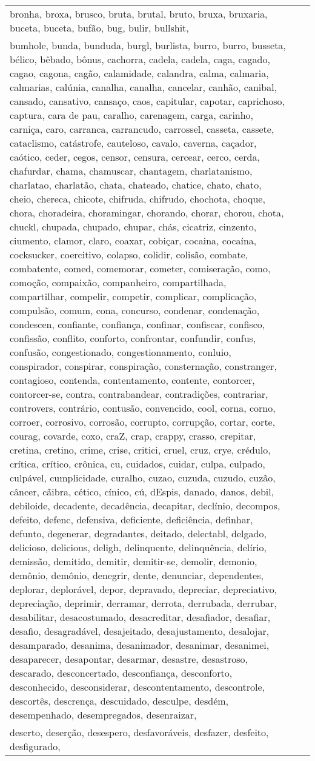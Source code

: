 \begin{longtable}{|*3{p{15cm}|}}
bronha, broxa, brusco, bruta, brutal, bruto, bruxa, bruxaria, buceta, buceta, bufão, bug, bulir, bullshit, \\ bumhole, bunda, bunduda, burgl, burlista, burro, burro, busseta, bélico, bêbado, bônus, cachorra, cadela, cadela, caga, cagado, cagao, cagona, cagão, calamidade, calandra, calma, calmaria, calmarias, calúnia, canalha, canalha, cancelar, canhão, canibal, cansado, cansativo, cansaço, caos, capitular, capotar, caprichoso, captura, cara de pau, caralho, carenagem, carga, carinho, carniça, caro, carranca, carrancudo, carrossel, casseta, cassete, cataclismo, catástrofe, cauteloso, cavalo, caverna, caçador, caótico, ceder, cegos, censor, censura, cercear, cerco, cerda, chafurdar, chama, chamuscar, chantagem, charlatanismo, charlatao, charlatão, chata, chateado, chatice, chato, chato, cheio, chereca, chicote, chifruda, chifrudo, chochota, choque, chora, choradeira, choramingar, chorando, chorar, chorou, chota, chuckl, chupada, chupado, chupar, chás, cicatriz, cinzento, ciumento, clamor, claro, coaxar, cobiçar, cocaina, cocaína, cocksucker, coercitivo, colapso, colidir, colisão, combate, combatente, comed, comemorar, cometer, comiseração, como, comoção, compaixão, companheiro, compartilhada, compartilhar, compelir, competir, complicar, complicação, compulsão, comum, cona, concurso, condenar, condenação, condescen, confiante, confiança, confinar, confiscar, confisco, confissão, conflito, conforto, confrontar, confundir, confus, confusão, congestionado, congestionamento, conluio, conspirador, conspirar, conspiração, consternação, constranger, contagioso, contenda, contentamento, contente, contorcer, contorcer-se, contra, contrabandear,  contradições, contrariar, controvers, contrário, contusão, convencido, cool, corna, corno, corroer, corrosivo, corrosão, corrupto, corrupção, cortar, corte, courag, covarde, coxo, craZ, crap, crappy, crasso, crepitar, cretina, cretino, crime, crise, critici, cruel, cruz, crye, crédulo, crítica, crítico, crônica, cu, cuidados, cuidar, culpa, culpado, culpável, cumplicidade, curalho, cuzao, cuzuda, cuzudo, cuzão, câncer, cãibra, cético, cínico, cú, dEspis, danado, danos, debil, debiloide, decadente, decadência, decapitar, declínio, decompos, defeito, defenc, defensiva, deficiente, deficiência, definhar, defunto, degenerar, degradantes, deitado, delectabl, delgado, delicioso, delicious, deligh, delinquente, delinquência, delírio, demissão, demitido, demitir, demitir-se, demolir, demonio, demônio, demônio, denegrir, dente, denunciar, dependentes, deplorar, deplorável, depor, depravado, depreciar, depreciativo, depreciação, deprimir, derramar, derrota, derrubada, derrubar, desabilitar, desacostumado, desacreditar, desafiador, desafiar, desafio, desagradável, desajeitado, desajustamento, desalojar, desamparado, desanima, desanimador, desanimar, desanimei, desaparecer, desapontar, desarmar, desastre, desastroso, descarado, desconcertado, desconfiança, desconforto, desconhecido, desconsiderar, descontentamento, descontrole, descortês, descrença, descuidado, desculpe, desdém, desempenhado, desempregados, desenraizar, \\ deserto, deserção, desespero, desfavoráveis, desfazer, desfeito, desfigurado, 
\end{longtable}
